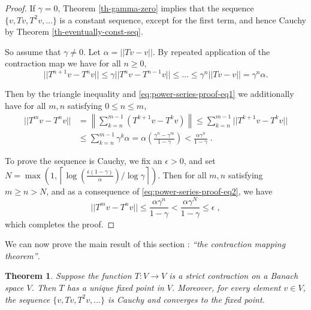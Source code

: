 \documentclass{article}
\newtheorem{theorem}{Theorem}[section]
\theoremstyle{definition}
\theoremstyle{remark}
\newcommand{\norm}[1]{\left\lVert#1\right\rVert}
\begin{document}
\begin{proof}
If $\gamma = 0$, Theorem \ref{th-gamma-zero} implies that the sequence $\{v,Tv,T^{2}v,\dots\}$ is a constant sequence, except for the first term, and hence Cauchy by Theorem \ref{th-eventually-const-seq}.

So assume that $\gamma \neq 0$. Let $\alpha = ||Tv - v||$. By repeated application of the contraction map we have for all $n \geq 0$,
\begin{equation}
||T^{n+1}v - T^{n}v|| \leq \gamma ||T^{n}v - T^{n-1}v|| \leq \dots \leq \gamma^{n}||Tv - v|| = \gamma^{n} \alpha.
\label{eq:power-series-proof-eq1}
\end{equation}

Then by the triangle inequality and \eqref{eq:power-series-proof-eq1} we additionally have for all $m,n$ satisfying $0 \leq n \leq m$,
\begin{equation}
\begin{split}
||T^{m}v - T^{n}v|| &= \norm{\sum_{k=n}^{m-1}(T^{k+1}v - T^{k}v)} \leq \sum_{k=n}^{m-1} ||T^{k+1}v - T^{k}v|| \\
&\leq \sum_{k=n}^{m-1} \gamma^{k} \alpha = \alpha \left( \frac{\gamma^{n} - \gamma^{m}}{1 - \gamma} \right) < \frac{\alpha\gamma^{n}}{1 - \gamma} \;.
\end{split}
\label{eq:power-series-proof-eq2}
\end{equation}

To prove the sequence is Cauchy, we fix an $\epsilon > 0$, and set $N = \max \left(1, \left \lceil \log \left(\frac{\epsilon(1-\gamma)}{\alpha} \right) \bigg / \log \gamma \right \rceil \right)$.
Then for all $m,n$ satisfying $m\geq n > N$, and as a consequence of \eqref{eq:power-series-proof-eq2}, we have 
\begin{equation}
||T^{m}v - T^{n}v|| \leq \frac{\alpha\gamma^{n}}{1 - \gamma} < \frac{\alpha\gamma^{N}}{1 - \gamma} \leq \epsilon \; ,\label{eq:power-series-proof-eq3}
\end{equation}
which completes the proof.
\end{proof}

We can now prove the main result of this section : \textit{``the contraction mapping theorem''}.
\begin{theorem}
Suppose the function $T:V \rightarrow V$ is a strict contraction on a Banach space $V$. Then $T$ has a unique fixed point in $V$. Moreover, for every element $v \in V$, the sequence $\{v,Tv,T^{2}v,\dots\}$ is Cauchy and converges to the fixed point.
\label{th-contraction-mapping}
\end{theorem}
\end{document}
